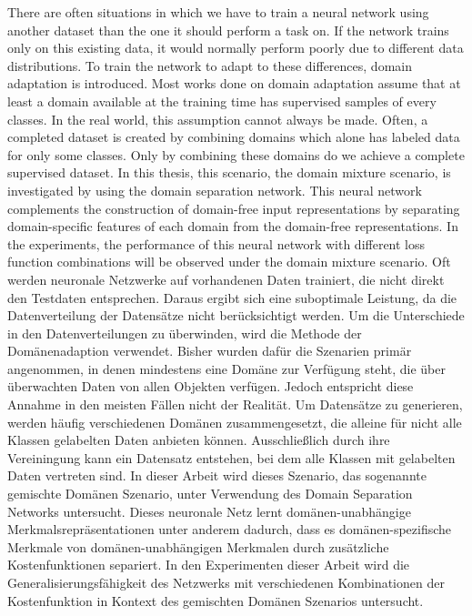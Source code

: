 \documentclass[a4paper,            	%
               12pt,               	%
               chapterprefix,      	%
               appendixprefix,		%
               headsepline,        	%
               twoside,				%
               draft=false]         %
               {scrbook}			%
\theoremstyle{defstyle}
\theoremstyle{bspstyle}
\begin{document}
\frontmatter			%
\maketitle				%
\begin{BaMaAbstract}{	%
	There are often situations in which we have to train a neural network using another dataset than the one it should perform a task on. If the network trains only on this existing data, it would normally perform poorly due to different data distributions. To train the network to adapt to these differences, domain adaptation is introduced. Most works done on domain adaptation assume that at least a domain available at the training time has supervised samples of every classes. In the real world, this assumption cannot always be made. Often, a completed dataset is created by combining domains which alone has labeled data for only some classes. Only by combining these domains do we achieve a complete supervised dataset. In this thesis, this scenario, the domain mixture scenario, is investigated by using the domain separation network. This neural network complements the construction of domain-free input representations by separating domain-specific features of each domain from the domain-free representations. In the experiments, the performance of this neural network with different loss function combinations will be observed under the domain mixture scenario.
}{ 
	Oft werden neuronale Netzwerke auf vorhandenen Daten trainiert, die nicht direkt den Testdaten entsprechen. Daraus ergibt sich eine suboptimale Leistung, da die Datenverteilung der Datensätze nicht berücksichtigt werden. Um die Unterschiede in den Datenverteilungen zu überwinden, wird die Methode der Domänenadaption verwendet. Bisher wurden dafür die Szenarien primär angenommen, in denen mindestens eine Domäne zur Verfügung steht, die über überwachten Daten von allen Objekten verfügen. Jedoch entspricht diese Annahme in den meisten Fällen nicht der Realität. Um Datensätze zu generieren, werden häufig verschiedenen Domänen zusammengesetzt, die alleine für nicht alle Klassen gelabelten Daten anbieten können. Ausschließlich durch ihre Vereiningung kann ein Datensatz entstehen, bei dem alle Klassen mit gelabelten Daten vertreten sind. In dieser Arbeit wird dieses Szenario, das sogenannte gemischte Domänen Szenario, unter Verwendung des Domain Separation Networks untersucht. Dieses neuronale Netz lernt domänen-unabhängige Merkmalsrepräsentationen unter anderem dadurch, dass es domänen-spezifische Merkmale von domänen-unabhängigen Merkmalen durch zusätzliche Kostenfunktionen separiert. In den Experimenten dieser Arbeit wird die Generalisierungsfähigkeit des Netzwerks mit verschiedenen Kombinationen der Kostenfunktion in Kontext des gemischten Domänen Szenarios untersucht.}
\end{BaMaAbstract}
\end{document}
